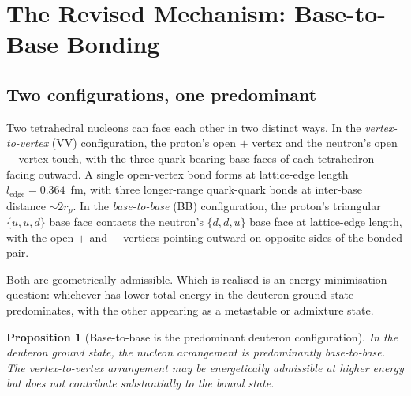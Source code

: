 \documentclass[11pt,letterpaper]{article}
\newtheorem{proposition}[theorem]{Proposition}
\newcommand{\ledge}{l_{\mathrm{edge}}}
\newcommand{\rp}{r_{p}}
\begin{document}
\section{The Revised Mechanism: Base-to-Base Bonding}
\label{sec:mechanism}

\subsection{Two configurations, one predominant}
\label{sec:two_configs}

Two tetrahedral nucleons can face each other in two distinct ways. In the \emph{vertex-to-vertex} (VV) configuration, the proton's open $+$ vertex and the neutron's open $-$ vertex touch, with the three quark-bearing base faces of each tetrahedron facing outward. A single open-vertex bond forms at lattice-edge length $\ledge = 0.364$~fm, with three longer-range quark-quark bonds at inter-base distance $\sim 2\rp$. In the \emph{base-to-base} (BB) configuration, the proton's triangular $\{u,u,d\}$ base face contacts the neutron's $\{d,d,u\}$ base face at lattice-edge length, with the open $+$ and $-$ vertices pointing outward on opposite sides of the bonded pair.

Both are geometrically admissible. Which is realised is an energy-minimisation question: whichever has lower total energy in the deuteron ground state predominates, with the other appearing as a metastable or admixture state.

\begin{proposition}[Base-to-base is the predominant deuteron configuration]
\label{prop:BB_preferred}
In the deuteron ground state, the nucleon arrangement is predominantly base-to-base. The vertex-to-vertex arrangement may be energetically admissible at higher energy but does not contribute substantially to the bound state.
\end{proposition}
\end{document}
